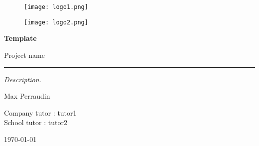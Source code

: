 \newcommand{\Authors}{Max Perraudin}
\newcommand{\Title}{Template}
\newcommand{\SubTitle}{\Project}
\newcommand{\Projectdescription}{Description.}
\newcommand{\Project}{Project name}
\newcommand{\university}{University or school}
\newcommand{\Date}{\today}
\newcommand{\company}{Company}
\newcommand{\Tuteur}{\small Company tutor : \large tutor1 \\ \small School tutor : \large tutor2}

\begin{titlepage}
\thispagestyle{empty}
\myfont

\begin{figure} [H]
    \vspace{-2cm}
    \centering
    \begin{minipage}[t]{.45\linewidth}
        \raggedright
        \texttt{[image: logo1.png]}
    \end{minipage}%
    \begin{minipage}[t]{.45\linewidth}
        \raggedleft
        \texttt{[image: logo2.png]} 
    \end{minipage}
\end{figure}





\vspace{1 cm}
\par
\noindent
\Huge
\textbf{\Title}
\vspace{0.2cm}
\LARGE
\par
\noindent
\SubTitle\\
\rule[0.3cm]{\linewidth}{2pt}
\Large


\noindent
\small
\textit{\Projectdescription}

\vspace{0.5cm}
\noindent
\large
\Authors
\par \noindent
\raggedleft
\Tuteur
\vspace{0.5 cm}
\small
\par \noindent
\Date

\end{titlepage}